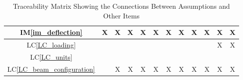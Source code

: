 \documentclass[12pt]{article}
\newcommand{\iref}[1]{IM\ref{#1}}
\newcommand{\lcref}[1]{LC\ref{#1}}
\begin{document}
{\begin{landscape}
\begin{table}[h!]
\begin{tabular}{|c|c|c|c|c|c|c|c|c|c|c|c|}
                \iref{im_deflection}          & X                      & X                   & X                     & X                                 & X                          & X                                   & X                            & X                            & X                      & X                                & X                         \\ \hline
                \lcref{LC_loading}            &                        &                     &                       &                                   &                            &                                     &                              &                              &                        & X                                & X                         \\ \hline
                \lcref{LC_units}              &                        &                     &                       &                                   &                            &                                     &                              &                              &                        &                                  &                           \\ \hline
                \lcref{LC_beam_configuration} &                        & X                   & X                     & X                                 & X                          & X                                   & X                            & X                            & X                      & X                                & X                         \\ \hline
            \end{tabular}
            \caption{Traceability Matrix Showing the Connections Between Assumptions and Other Items}
            \label{Table:A_trace}
        \end{table}
    \end{landscape}
}
\end{document}
